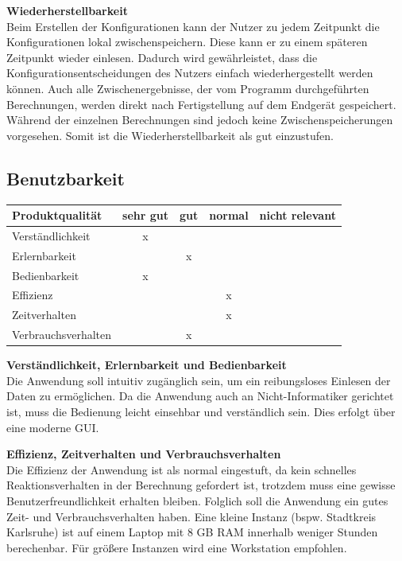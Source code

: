 \documentclass[parskip=full]{scrartcl} %
\begin{document}
\textbf{Wiederherstellbarkeit\\}
Beim Erstellen der Konfigurationen kann der Nutzer zu jedem Zeitpunkt die Konfigurationen lokal zwischenspeichern. Diese kann er zu einem späteren Zeitpunkt wieder einlesen. Dadurch wird gewährleistet, dass die Konfigurationsentscheidungen des Nutzers einfach wiederhergestellt werden können.
Auch alle Zwischenergebnisse, der vom Programm durchgeführten Berechnungen, werden direkt nach Fertigstellung auf dem Endgerät gespeichert. Während der einzelnen Berechnungen sind jedoch keine Zwischenspeicherungen vorgesehen.
Somit ist die Wiederherstellbarkeit als gut einzustufen.


\newpage 


\subsection{Benutzbarkeit}

    \begin{tabular}{|l| c| c| c| c|}
    \hline
        Produktqualität & sehr gut & gut & normal & nicht relevant \\
    \hline
        Verständlichkeit & x & & &\\
    \hline
        Erlernbarkeit & & x & &\\
    \hline
        Bedienbarkeit & x & & &\\
    \hline
        Effizienz & & & x &\\
    \hline
        Zeitverhalten & & & x &\\
    \hline
        Verbrauchsverhalten & & x & &\\
    \hline
    \end{tabular}

\textbf{Verständlichkeit, Erlernbarkeit und Bedienbarkeit}\\
Die Anwendung soll intuitiv zugänglich sein, um ein reibungsloses Einlesen der Daten zu ermöglichen. Da die Anwendung auch an Nicht-Informatiker gerichtet ist, muss die Bedienung leicht einsehbar und verständlich sein. Dies erfolgt über eine moderne GUI.

\textbf{Effizienz, Zeitverhalten und Verbrauchsverhalten}\\
Die Effizienz der Anwendung ist als normal eingestuft, da kein schnelles Reaktionsverhalten in der Berechnung gefordert ist, trotzdem muss eine gewisse Benutzerfreundlichkeit erhalten bleiben. Folglich soll die Anwendung ein gutes Zeit- und Verbrauchsverhalten haben.
Eine kleine Instanz (bspw. Stadtkreis Karlsruhe) ist auf einem Laptop mit 8 GB RAM innerhalb weniger Stunden berechenbar. Für größere Instanzen wird eine Workstation empfohlen.
\end{document}
